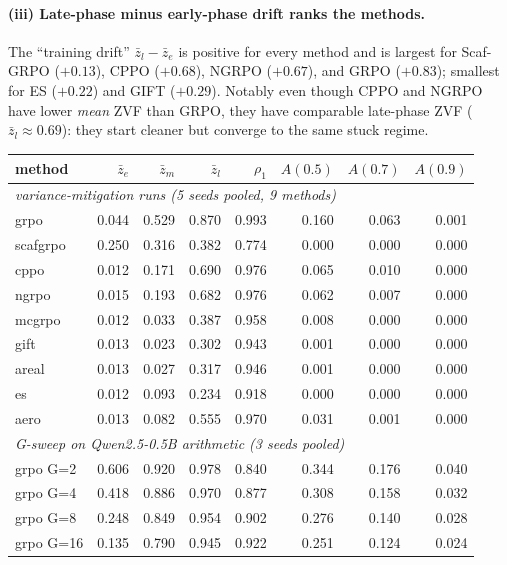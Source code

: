 \paragraph{(iii) Late-phase minus early-phase drift ranks the methods.}
The ``training drift'' $\bar z_l - \bar z_e$ is positive for every
method and is largest for Scaf-GRPO ($+0.13$), CPPO ($+0.68$),
NGRPO ($+0.67$), and GRPO ($+0.83$); smallest for ES ($+0.22$) and
GIFT ($+0.29$). Notably even though CPPO and NGRPO have lower
\emph{mean} ZVF than GRPO, they have comparable late-phase ZVF
($\bar z_l \approx 0.69$): they start cleaner but converge to the
same stuck regime.

\begin{table}[htbp]
\centering
\small
\begin{tabular}{lrrrrrrr}
\toprule
method & $\bar z_e$ & $\bar z_m$ & $\bar z_l$ & $\rho_1$ & $A(0.5)$ & $A(0.7)$ & $A(0.9)$ \\
\midrule
\multicolumn{8}{l}{\emph{variance-mitigation runs (5 seeds pooled, 9 methods)}}\\
grpo      & 0.044 & 0.529 & 0.870 & 0.993 & 0.160 & 0.063 & 0.001 \\
scafgrpo  & 0.250 & 0.316 & 0.382 & 0.774 & 0.000 & 0.000 & 0.000 \\
cppo      & 0.012 & 0.171 & 0.690 & 0.976 & 0.065 & 0.010 & 0.000 \\
ngrpo     & 0.015 & 0.193 & 0.682 & 0.976 & 0.062 & 0.007 & 0.000 \\
mcgrpo    & 0.012 & 0.033 & 0.387 & 0.958 & 0.008 & 0.000 & 0.000 \\
gift      & 0.013 & 0.023 & 0.302 & 0.943 & 0.001 & 0.000 & 0.000 \\
areal     & 0.013 & 0.027 & 0.317 & 0.946 & 0.001 & 0.000 & 0.000 \\
es        & 0.012 & 0.093 & 0.234 & 0.918 & 0.000 & 0.000 & 0.000 \\
aero      & 0.013 & 0.082 & 0.555 & 0.970 & 0.031 & 0.001 & 0.000 \\
\midrule
\multicolumn{8}{l}{\emph{G-sweep on Qwen2.5-0.5B arithmetic (3 seeds pooled)}}\\
grpo G=2  & 0.606 & 0.920 & 0.978 & 0.840 & 0.344 & 0.176 & 0.040 \\
grpo G=4  & 0.418 & 0.886 & 0.970 & 0.877 & 0.308 & 0.158 & 0.032 \\
grpo G=8  & 0.248 & 0.849 & 0.954 & 0.902 & 0.276 & 0.140 & 0.028 \\
grpo G=16 & 0.135 & 0.790 & 0.945 & 0.922 & 0.251 & 0.124 & 0.024 \\

\end{tabular}
\end{table}
